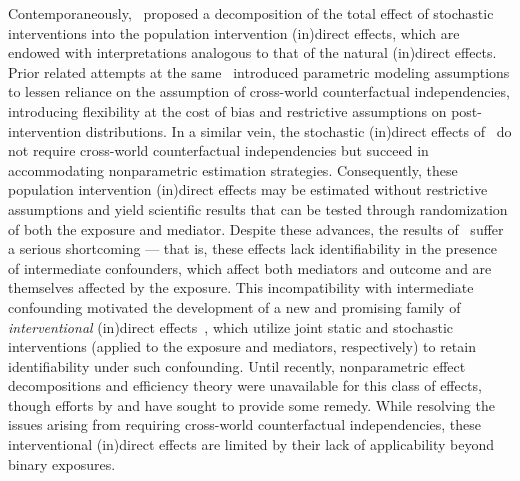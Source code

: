 Contemporaneously,~\citet{diaz2020causal} proposed a decomposition of the total
effect of stochastic interventions into the population intervention (in)direct
effects, which are endowed with interpretations analogous to that of the natural
(in)direct effects. Prior related attempts at the
same~\citep[e.g.,][]{vansteelandt2012imputation} introduced parametric modeling
assumptions to lessen reliance on the assumption of cross-world counterfactual
independencies, introducing flexibility at the cost of bias and restrictive
assumptions on post-intervention distributions. In a similar vein, the
stochastic (in)direct effects of~\citet{diaz2020causal} do not require
cross-world counterfactual independencies but succeed in accommodating
nonparametric estimation strategies. Consequently, these population intervention
(in)direct effects may be estimated without restrictive assumptions and yield
scientific results that can be tested through randomization of both the
exposure and mediator. Despite these advances, the results
of~\citet{diaz2020causal} suffer a serious shortcoming --- that is, these
effects lack identifiability in the presence of intermediate confounders, which
affect both mediators and outcome and are themselves affected by the exposure.
This incompatibility with intermediate confounding motivated the development of
a new and promising family of \textit{interventional} (in)direct
effects~\citep{didelez2006direct, vanderweele2014effect, lok2016defining,
vansteelandt2017interventional, zheng2017longitudinal, rudolph2017robust,
lok2019causal, nguyen2020clarifying}, which utilize joint static and stochastic
interventions (applied to the exposure and mediators, respectively) to retain
identifiability under such confounding. Until recently, nonparametric effect
decompositions and efficiency theory were unavailable for this class of effects,
though efforts by \citet{diaz2020nonparametric} and
\citet{benkeser2020nonparametric} have sought to provide some remedy. While
resolving the issues arising from requiring cross-world counterfactual
independencies, these interventional (in)direct effects are limited by their
lack of applicability beyond binary exposures.

